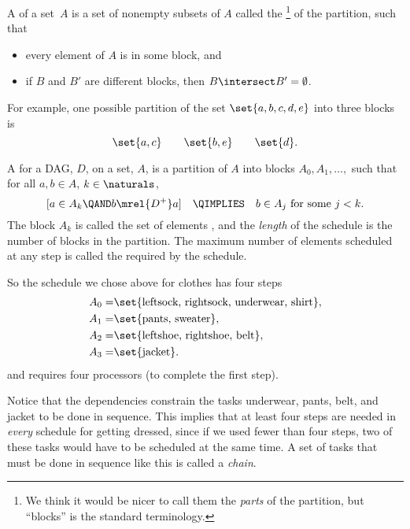 \begin{definition}\label{def:partition}
A  of a set~$A$ is a set of nonempty
subsets of $A$ called the \footnote{We think it would
  be nicer to call them the \emph{parts} of the partition, but
  ``blocks'' is the standard terminology.} of the partition, such that
\begin{itemize}
\item every element of $A$ is in some block, and

\item if $B$ and $B'$ are different blocks, then $B \intersect B' =
  \emptyset$.

\iffalse $A= \lgunion_{B\in \mathcal{P}} B$.\fi

\end{itemize}
\end{definition}

For example, one possible partition of the set $\set{a, b, c, d, e}$
into three blocks is
\[
\set{a, c} \qquad \set{b, e} \qquad \set{d}.
\]

\begin{definition}\label{def:schedule}
A  for a DAG, $D$, on a
set, $A$, is a partition of $A$ into blocks $A_0, A_1,\dots,$ such
that for all $a,b \in A$, $k \in \naturals$,
\[
[a \in A_k \QAND b \mrel{D^{+}} a] \quad\QIMPLIES\quad b \in A_j
\text{ for some } j < k.
\]
The block $A_k$ is called the set of elements , and the \emph{length} of the schedule is the number of blocks
in the partition.  The maximum number of elements scheduled at any
step is called the  required by the
schedule.
\end{definition}

\iffalse

So the schedule we chose above for clothes has four steps
\begin{align*}
A_0 = & \set{\text{leftsock, rightsock, underwear, shirt}},\\
A_1 = & \set{\text{pants, sweater}},\\
A_2 = & \set{\text{leftshoe, rightshoe, belt}},\\
A_3 = & \set{\text{jacket}}.
\end{align*}
and requires four processors (to complete the first step).

Notice that the dependencies constrain the tasks underwear, pants,
belt, and jacket to be done in sequence.  This implies
that at least four steps are needed in \emph{every} schedule for
getting dressed, since if we used fewer than four steps, two of these
tasks would have to be scheduled at the same time.  A set of tasks
that must be done in sequence like this is called a \emph{chain}.

